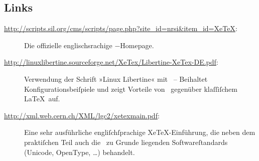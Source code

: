 ﻿\documentclass{scrartcl}
\begin{document}
\subsection{Links}
\begin{description}
\item[\url{http://scripts.sil.org/cms/scripts/page.php?site_id=nrsi&item_id=XeTeX}:] Die offizielle englischsrachige \XeTeX−Homepage.
\item[\url{http://linuxlibertine.sourceforge.net/XeTex/Libertine-XeTex-DE.pdf}:] Verwendung der Schrift »Linux Libertine« mit \XeTeX\ – Beihaltet Konfigurationsbeiſpiele und zeigt Vorteile von \XeTeX\ gegenüber klaſſiſchem \LaTeX\ auf.
\item[\url{http://xml.web.cern.ch/XML/lgc2/xetexmain.pdf}:] Eine sehr ausführliche engliſchſprachige XeTeX-Einführung, die neben dem praktiſchen Teil auch die \XeTeX\ zu Grunde liegenden Softwareſtandards (Unicode, OpenType, …) behandelt.
\end{description}



\end{document}
